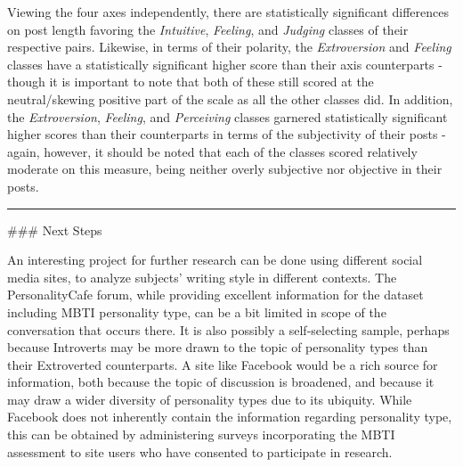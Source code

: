 \documentclass[11pt]{article}
\begin{document}
Viewing the four axes independently, there are statistically significant
differences on post length favoring the \emph{Intuitive},
\emph{Feeling}, and \emph{Judging} classes of their respective pairs.
Likewise, in terms of their polarity, the \emph{Extroversion} and
\emph{Feeling} classes have a statistically significant higher score
than their axis counterparts - though it is important to note that both
of these still scored at the neutral/skewing positive part of the scale
as all the other classes did. In addition, the \emph{Extroversion},
\emph{Feeling}, and \emph{Perceiving} classes garnered statistically
significant higher scores than their counterparts in terms of the
subjectivity of their posts - again, however, it should be noted that
each of the classes scored relatively moderate on this measure, being
neither overly subjective nor objective in their posts.

    \begin{center}\rule{0.5\linewidth}{\linethickness}\end{center}

     \#\#\# Next Steps

An interesting project for further research can be done using different
social media sites, to analyze subjects' writing style in different
contexts. The PersonalityCafe forum, while providing excellent
information for the dataset including MBTI personality type, can be a
bit limited in scope of the conversation that occurs there. It is also
possibly a self-selecting sample, perhaps because Introverts may be more
drawn to the topic of personality types than their Extroverted
counterparts. A site like Facebook would be a rich source for
information, both because the topic of discussion is broadened, and
because it may draw a wider diversity of personality types due to its
ubiquity. While Facebook does not inherently contain the information
regarding personality type, this can be obtained by administering
surveys incorporating the MBTI assessment to site users who have
consented to participate in research.


    
    
    
    
\end{document}
